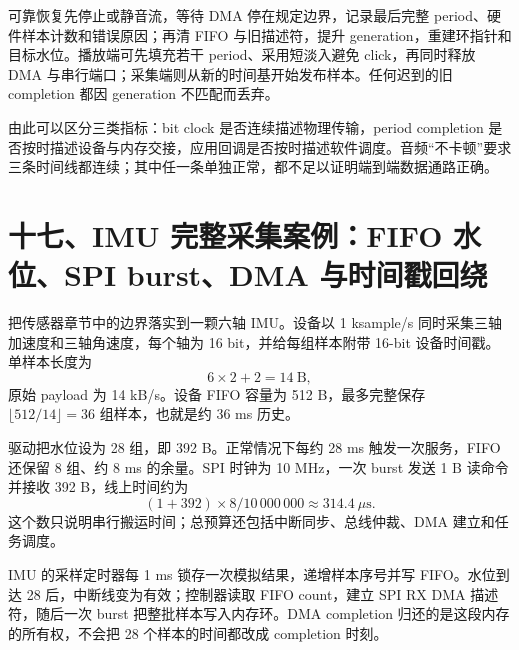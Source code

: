 可靠恢复先停止或静音流，等待 DMA 停在规定边界，记录最后完整 period、硬件样本计数和错误原因；再清 FIFO 与旧描述符，提升 generation，重建环指针和目标水位。播放端可先填充若干 period、采用短淡入避免 click，再同时释放 DMA 与串行端口；采集端则从新的时间基开始发布样本。任何迟到的旧 completion 都因 generation 不匹配而丢弃。

由此可以区分三类指标：bit clock 是否连续描述物理传输，period completion 是否按时描述设备与内存交接，应用回调是否按时描述软件调度。音频“不卡顿”要求三条时间线都连续；其中任一条单独正常，都不足以证明端到端数据通路正确。
\section{十七、IMU 完整采集案例：FIFO 水位、SPI burst、DMA 与时间戳回绕}

把传感器章节中的边界落实到一颗六轴 IMU。设备以 1 ksample/s 同时采集三轴加速度和三轴角速度，每个轴为 16 bit，并给每组样本附带 16-bit 设备时间戳。单样本长度为
\[
6\times2+2=14\ \text{B},
\]
原始 payload 为 14 kB/s。设备 FIFO 容量为 512 B，最多完整保存 $\lfloor512/14\rfloor=36$ 组样本，也就是约 36 ms 历史。

驱动把水位设为 28 组，即 392 B。正常情况下每约 28 ms 触发一次服务，FIFO 还保留 8 组、约 8 ms 的余量。SPI 时钟为 10 MHz，一次 burst 发送 1 B 读命令并接收 392 B，线上时间约为
\[
(1+392)\times8/10\,000\,000\approx314.4\ \mu\text{s}.
\]
这个数只说明串行搬运时间；总预算还包括中断同步、总线仲裁、DMA 建立和任务调度。


IMU 的采样定时器每 1 ms 锁存一次模拟结果，递增样本序号并写 FIFO。水位到达 28 后，中断线变为有效；控制器读取 FIFO count，建立 SPI RX DMA 描述符，随后一次 burst 把整批样本写入内存环。DMA completion 归还的是这段内存的所有权，不会把 28 个样本的时间都改成 completion 时刻。

